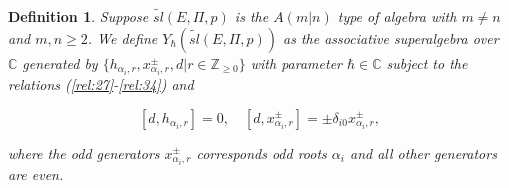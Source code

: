 \documentclass[english]{elsarticle}
\newtheorem{definition}{Definition}[section]
\numberwithin{equation}{section}
\begin{document}
\begin{definition}
Suppose $\tilde{sl}(E,\Pi,p)$ is the $A(m|n)$ type of algebra with $m\neq n$ and $m,n\geq 2$. We define $Y_{\hbar}(\tilde{sl}(E,\Pi,p))$ as the associative superalgebra over $\mathbb{C}$ generated by $\{h_{\alpha_i, r},   x_{\alpha_i,r}^{\pm}, d |r\in \mathbb{Z}_{\geq 0}\}$ with parameter $\hbar \in \mathbb{C}$ subject to the relations (\ref{rel:27}-\ref{rel:34}) and

\begin{equation}\label{in:1}
    [d,h_{\alpha_i,r}]=0,\quad  [d, x_{\alpha_i,r}^{\pm}]= \pm \delta_{i0}x_{\alpha_i,r}^{\pm},
\end{equation}


where the odd generators $x_{\alpha_{i},r}^{\pm}$ corresponds odd roots $\alpha_i$ and all other generators are even.\\
\end{definition}












\end{document}
